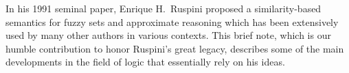 
%
In his 1991 seminal paper, Enrique H.\ Ruspini proposed a similarity-based semantics for fuzzy sets and approximate reasoning which has been extensively used by many other authors in various contexts. This brief note, which is our humble contribution to honor Ruspini's great legacy, describes some of the main developments in the field of logic that essentially rely on his ideas.
%

